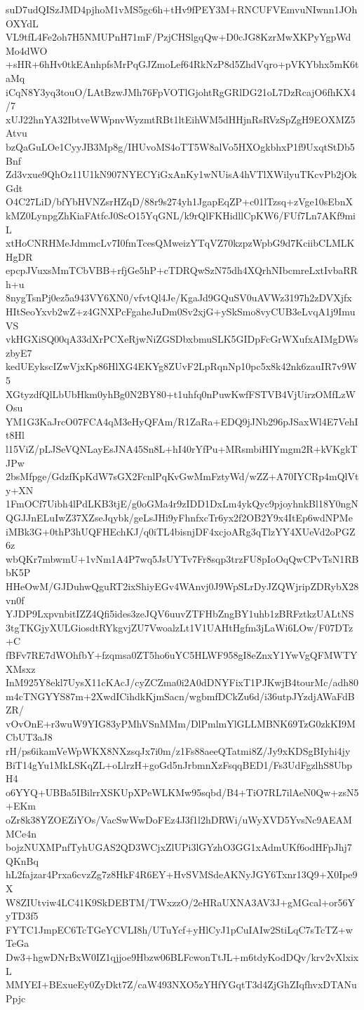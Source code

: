 suD7udQISzJMD4pjhoM1vMS5gc6h+tHv9fPEY3M+RNCUFVEmvuNIwnn1JOhOXYdL
VL9tfL4Fe2oh7H5NMUPnH71mF/PzjCHSlgqQw+D0cJG8KzrMwXKPyYgpWdMo4dWO
+sHR+6hHv0tkEAnhpfsMrPqGJZmoLef64RkNzP8d5ZhdVqro+pVKYbhx5mK6taMq
iCqN8Y3yq3touO/LAtBzwJMh76FpVOTlGjohtRgGRlDG21oL7DzRcajO6fhKX4/7
xUJ22hnYA32IbtveWWpnvWyzmtRBt1ltEihWM5dHHjnRsRVzSpZgH9EOXMZ5Atvu
bzQaGuLOe1CyyJB3Mp8g/IHUvoMS4oTT5W8alVo5HXOgkbhxP1f9UxqtStDb5Bnf
Zd3vxue9QhOz11U1kN907NYECYiGxAnKy1wNUisA4hVTlXWilyuTKcvPb2jOkGdt
O4C27LiD/bfYbHVNZsrHZqD/88r9s274yh1JgapEqZP+c01lTzsq+zVge10sEbnX
kMZ0LynpgZhKiaFAtfcJ0ScO15YqGNL/k9rQlFKHidllCpKW6/FUf7Ln7AKf9miL
xtHoCNRHMeJdmmcLv7I0fmTcesQMweizYTqVZ70kzpzWpbG9d7KciibCLMLKHgDR
epcpJVuxsMmTCbVBB+rfjGe5hP+cTDRQwSzN75dh4XQrhNIbcmreLxtIvbaRRh+u
8nygTsnPj0ez5a943VY6XN0/vfvtQl4Je/KgaJd9GQuSV0uAVWz3197h2zDVXjfx
HItSeoYxvb2wZ+z4GNXPcFgaheJuDm0Sv2xjG+ySkSmo8vyCUB3eLvqA1j9ImuVS
vkHGXiSQ00qA33dXrPCXeRjwNiZGSDbxbmuSLK5GIDpFcGrWXufxAIMgDWszbyE7
kedUEykscIZwVjxKp86HlXG4EKYg8ZUvF2LpRqnNp10pc5x8k42nk6zauIR7v9W5
XGtyzdfQlLbUbHkm0yhBg0N2BY80+t1uhfq0nPuwKwfFSTVB4VjUirzOMfLzWOsu
YM1G3KaJrcO07FCA4qM3eHyQFAm/R1ZaRa+EDQ9jJNb296pJSaxWl4E7VehIt8Hl
l15ViZ/pLJSeVQNLayEsJNA45Sn8L+hI40rYfPu+MRsmbiHIYmgm2R+kVKgkTJPw
2bsMfpge/GdzfKpKdW7sGX2FcnlPqKvGwMmFztyWd/wZZ+A70IYCRp4mQlVty+XN
1FmOCf7Uibh4lPdLKB3tjE/g0oGMa4r9zIDD1DxLm4ykQyc9pjoyhnkBl18Y0ngN
QGJJnELuIwZ37XZseJqybk/geLsJHi9yFhnfxcTr6yx2f2OB2Y9x4ItEp6wdNPMe
iMBk3G+0thP3hUQFHEchKJ/q0iTL4bisnjDF4xcjoARg3qTlzYY4XUeVd2oPGZ6z
wbQKr7mbwmU+1vNm1A4P7wq5JsUYTv7Fr8sqp3trzFU8pIoOqQwCPvTsN1RBbK5P
HHeOwM/GJDuhwQguRT2ixShiyEGv4WAnvj0J9WpSLrDyJZQWjripZDRybX28vn0f
YJDP9LxpvnbitIZZ4Qfi5ides3zeJQV6uuvZTFHbZngBY1uhb1zBRFztkzUALtNS
3tgTKGjyXULGiosdtRYkgvjZU7VwoalzLt1V1UAHtHgfm3jLaWi6LOw/F07DTz+C
fBFv7RE7dWOhfbY+fzqmsa0ZT5ho6uYC5HLWF958gI8eZnxY1YwVgQFMWTYXMsxz
InM925Y8ekl7UysX11cKAcJ/cyZCZma0i2A0dDNYFixT1PJKwjB4tourMc/adh80
m4cTNGYYS87m+2XwdICihdkKjmSacn/wgbmfDCkZu6d/i36utpJYzdjAWaFdBZR/
vOvOnE+r3wuW9YIG83yPMhVSnMMm/DlPmlmYlGLLMBNK69TzG0zkKI9MCbUT3aJ8
rH/ps6ikamVeWpWKX8NXzsqJx7i0m/z1Fs88aeeQTatmi8Z/Jy9xKDSgBIyhi4jy
BiT14gYu1MkLSKqZL+oLlrzH+goGd5nJrbmnXzFsqqBED1/Fs3UdFgzlhS8UbpH4
o6YYQ+UBBa5IBilrrXSKUpXPeWLKMw95sqbd/B4+TiO7RL7ilAeN0Qw+zsN5+EKm
oZr8k38YZOEZiYOs/VacSwWwDoFEz4J3f1l2hDRWi/uWyXVD5YvsNc9AEAMMCe4n
bojzNUXMPnfTyhUGAS2QD3WCjxZlUPi3lGYzhO3GG1xAdmUKf6odHFpJhj7QKnBq
hL2fajzar4Prxa6cvzZg7z8HkF4R6EY+HvSVMSdeAKNyJGY6Txnr13Q9+X0Ipe9X
W8ZIUtviw4LC41K9SkDEBTM/TWxzzO/2eHRaUXNA3AV3J+gMGcal+or56YyTD3f5
FYTC1JmpEC6TcTGeYCVLI8h/UTuYcf+yHlCyJ1pCuIAIw2StiLqC7sTcTZ+wTeGa
Dw3+hgwDNrBxW0IZ1qjjoe9Hbzw06BLFcwonTtJL+m6tdyKodDQv/krv2vXlxixL
MMYEI+BExueEy0ZyDkt7Z/caW493NXO5zYHfYGqtT3d4ZjGhZIqfhvxDTANuPpjc

